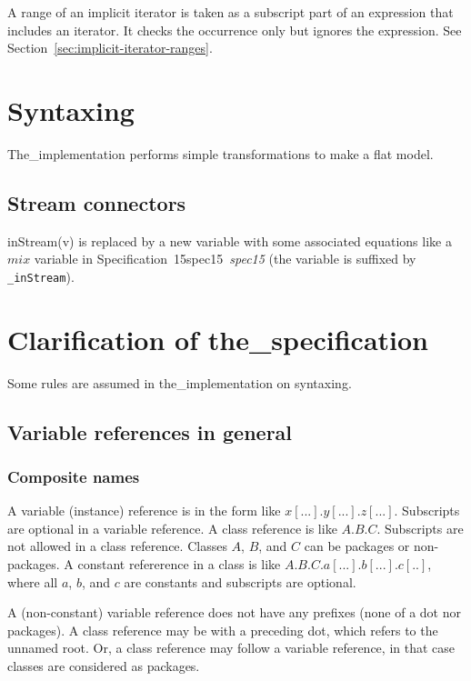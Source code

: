 \documentclass[10pt,b5paper]{article}
\def\specrefx#1#2{Specification~#1\ifx\relax#2\relax{}\else~{\it{}#2}\fi}
\def\specref#1{\specrefx{#1}{\csname spec#1\endcsname}}
\begin{document}
A range of an implicit iterator is taken as a subscript part of an
expression that includes an iterator.  It checks the occurrence only
but ignores the expression.  See
Section~\ref{sec:implicit-iterator-ranges}.


\section{Syntaxing}

The_implementation performs simple transformations to make a flat
model.

\subsection{Stream connectors}

inStream(v) is replaced by a new variable with some associated
equations like a $\mathit{mix}$ variable in \specref{15} (the variable
is suffixed by \verb'_inStream').


\section{Clarification of the_specification}

Some rules are assumed in the_implementation on syntaxing.


\subsection{Variable references in general}

\subsubsection*{Composite names}

A variable (instance) reference is in the form like
$x[...].y[...].z[...]$.  Subscripts are optional in a variable
reference.  A class reference is like $A.B.C$.  Subscripts are not
allowed in a class reference.  Classes $A$, $B$, and $C$ can be
packages or non-packages.  A constant refererence in a class is like
$A.B.C.a[...].b[...].c[..]$, where all $a$, $b$, and $c$ are constants
and subscripts are optional.

A (non-constant) variable reference does not have any prefixes (none
of a dot nor packages).  A class reference may be with a preceding
dot, which refers to the unnamed root.  Or, a class reference may
follow a variable reference, in that case classes are considered as
packages.
\end{document}
